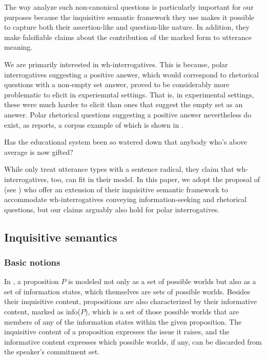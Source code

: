 \documentclass[output=paper,colorlinks,citecolor=brown            ,chinesefont]{langscibook}
\begin{document}
The way \citet{Farkas+2017} analyze such non-canonical questions is particularly important for our purposes because the inquisitive semantic framework they use makes it possible to capture both their assertion-like and question-like nature. In addition, they make falsifiable claims about the contribution of the marked form to utterance meaning. 

We are primarily interested in wh-interrogatives. This is because, polar interrogatives suggesting a positive answer, which would correspond to rhetorical questions with a non-empty set answer, proved to be considerably more problematic to elicit in experiemntal settings. That is, in experimental settings, these were much harder to elicit than ones that suggest the empty set as an answer. 
Polar rhetorical questions suggesting a positive answer nevertheless do exist, as \citet{Rohde2006} reports, a corpus example of which is shown in .

\begin{exe}
\ex\label{polar+} Has the educational system been so watered down that anybody who's above average is now gifted? \citep[135]{Rohde2006}
\end{exe}

While \citet{Farkas+2017} only treat utterance types with a sentence radical, they claim that wh-interrogatives, too, can fit in their model. In this paper, we adopt the proposal of \citet{Kiss+2021} (see ) who offer an extension of their inquisitive semantic framework to accommodate wh-interrogatives conveying information-seeking and rhetorical questions, but our claims arguably also hold for polar interrogatives.

\subsection{Inquisitive semantics}

\subsubsection{Basic notions}
\label{subsubsec:basic}

In \citet{Farkas+2017}, a proposition $P$ is modeled not only as a set of possible worlds \citep{Stalnaker1978} but also as a set of information states, which themselves are sets of possible worlds. Besides their inquisitive content, propositions are also characterized by their informative content, marked as info($P$), which is a set of those possible worlds that are members of any of the information states within the given proposition. The inquisitive content of a proposition expresses the issue it raises, and the informative content expresses which possible worlds, if any, can be discarded from the speaker's commitment set.
\end{document}
